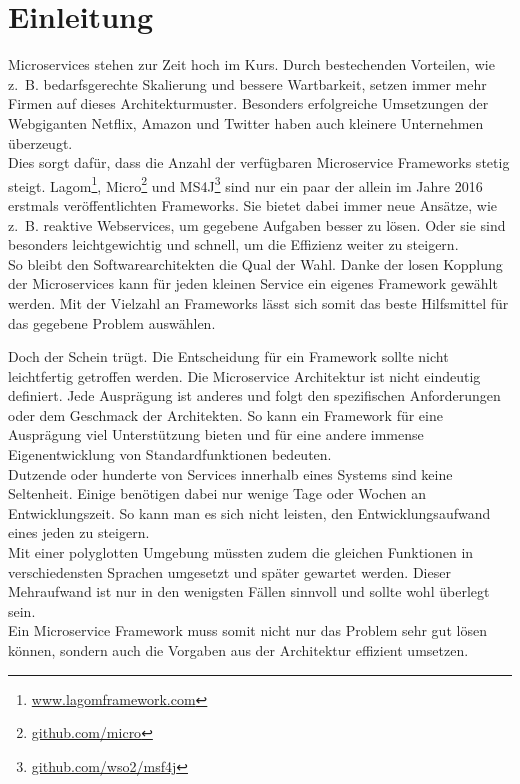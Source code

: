 \section{Einleitung}

Microservices stehen zur Zeit hoch im Kurs. Durch bestechenden Vorteilen, wie z.~B. bedarfsgerechte Skalierung und bessere Wartbarkeit, setzen immer mehr Firmen auf dieses Architekturmuster. Besonders erfolgreiche Umsetzungen der Webgiganten Netflix, Amazon und Twitter haben auch kleinere Unternehmen überzeugt\cite{Roewekamp2016}.\\ 
Dies sorgt dafür, dass die Anzahl der verfügbaren Microservice Frameworks stetig steigt. Lagom\footnote{\url{www.lagomframework.com}},  Micro\footnote{\url{github.com/micro}} und MS4J\footnote{\url{github.com/wso2/msf4j}} sind nur ein paar der allein im Jahre 2016 erstmals veröffentlichten Frameworks. Sie bietet dabei immer neue Ansätze, wie z.~B. reaktive Webservices, um gegebene Aufgaben besser zu lösen. Oder sie sind besonders leichtgewichtig und schnell, um die Effizienz weiter zu steigern. \\
So bleibt den Softwarearchitekten die Qual der Wahl. Danke der losen Kopplung der Microservices kann für jeden kleinen Service ein eigenes Framework gewählt werden. Mit der Vielzahl an Frameworks lässt sich somit das beste Hilfsmittel für das gegebene Problem auswählen.

Doch der Schein trügt. Die Entscheidung für ein Framework sollte nicht leichtfertig getroffen werden. Die Microservice Architektur ist nicht eindeutig definiert\cite[11]{Wolff2015}. Jede Ausprägung ist anderes und folgt den spezifischen Anforderungen oder dem Geschmack der Architekten. So kann ein Framework für eine Ausprägung viel Unterstützung bieten und für eine andere immense Eigenentwicklung von Standardfunktionen bedeuten.\\
Dutzende oder hunderte von Services innerhalb eines Systems sind keine Seltenheit. Einige benötigen dabei nur wenige Tage oder Wochen an Entwicklungszeit. So kann man es sich nicht leisten, den Entwicklungsaufwand eines jeden zu steigern\cite{Richardson2016}.\\ 
Mit einer polyglotten Umgebung müssten zudem die gleichen Funktionen in verschiedensten Sprachen umgesetzt und später gewartet werden. Dieser Mehraufwand ist nur in den wenigsten Fällen sinnvoll und sollte wohl überlegt sein.\\
Ein Microservice Framework muss somit nicht nur das Problem sehr gut lösen können, sondern auch die Vorgaben aus der Architektur effizient umsetzen.  

